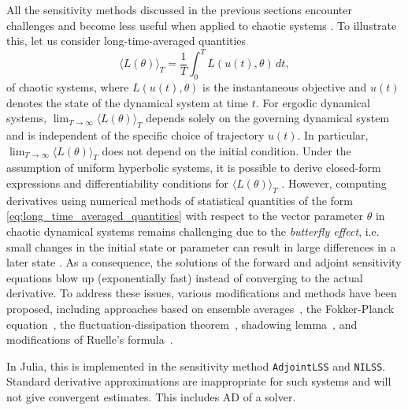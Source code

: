 
All the sensitivity methods discussed in the previous sections encounter challenges and become less useful when applied to chaotic systems \cite{Wang2012-chaos-adjoint}.
To illustrate this, let us consider long-time-averaged quantities 
\begin{equation}\label{eq:long_time_averaged_quantities}
    \langle L(\theta) \rangle_T = \frac{1}{T} \int_0^T L(u(t), \theta) \, dt, 
\end{equation}
of chaotic systems, where $L(u(t), \theta)$ is the instantaneous objective and $u(t)$ denotes the state of the dynamical system at time $t$.
For ergodic dynamical systems, $\lim_{T\to\infty} \langle L(\theta) \rangle_T$ depends solely on the governing dynamical system and is independent of the specific choice of trajectory $u(t)$. 
In particular, $\lim_{T\to\infty} \langle L(\theta) \rangle_T$ does not depend on the initial condition. 
Under the assumption of uniform hyperbolic systems, it is possible to derive closed-form expressions and differentiability conditions for $ \langle L(\theta) \rangle_T$ \cite{ruelle1997differentiation,ruelle2009review}.
However, computing derivatives using numerical methods of statistical quantities of the form \eqref{eq:long_time_averaged_quantities} with respect to the vector parameter $\theta$ in chaotic dynamical systems remains challenging due to the \textit{butterfly effect}, i.e. small changes in the initial state or parameter can result in large differences in a later state \cite{Lorenz.1963}.
As a consequence, the solutions of the forward and adjoint sensitivity equations blow up (exponentially fast) instead of converging to the actual derivative.
To address these issues, various modifications and methods have been proposed, including approaches based on ensemble averages~\cite{lea2000sensitivity, eyink2004ruelle}, the Fokker-Planck equation~\cite{thuburn2005climate, blonigan2014probability}, the fluctuation-dissipation theorem~\cite{leith1975climate, abramov2007blended, abramov2008new}, shadowing lemma~\cite{wang2013forward, wang2014least, wang2014convergence, ni2017sensitivity, blonigan2017adjoint, blonigan2018multiple, ni2019adjoint, ni2019sensitivity}, and modifications of Ruelle's formula~\cite{chandramoorthy2022efficient, ni2020fast}.

In Julia, this is implemented in the sensitivity method \texttt{AdjointLSS} and \texttt{NILSS}. 
Standard derivative approximations are inappropriate for such systems and will not give convergent estimates.
This includes AD of a solver.